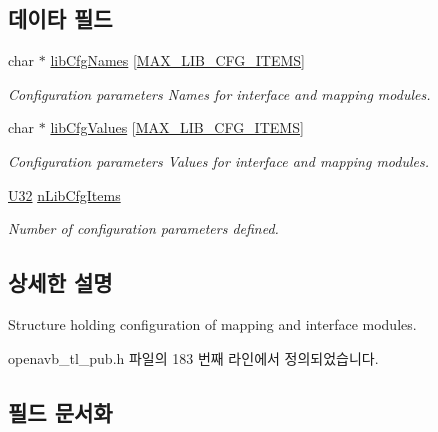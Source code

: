 \subsection*{데이타 필드}
\begin{DoxyCompactItemize}
\item 
char $\ast$ \hyperlink{structopenavb__tl__cfg__name__value__t_a6b520d18dfa6f6e0db32a7aaab48c507}{lib\+Cfg\+Names} \mbox{[}\hyperlink{tl_2openavb__tl__pub_8h_a43e337ad1ee671bfec5aadd8ea0a62f0}{M\+A\+X\+\_\+\+L\+I\+B\+\_\+\+C\+F\+G\+\_\+\+I\+T\+E\+MS}\mbox{]}
\begin{DoxyCompactList}\small\item\em Configuration parameters Names for interface and mapping modules. \end{DoxyCompactList}\item 
char $\ast$ \hyperlink{structopenavb__tl__cfg__name__value__t_a411ec7f07600718814c00ea5d84cecaf}{lib\+Cfg\+Values} \mbox{[}\hyperlink{tl_2openavb__tl__pub_8h_a43e337ad1ee671bfec5aadd8ea0a62f0}{M\+A\+X\+\_\+\+L\+I\+B\+\_\+\+C\+F\+G\+\_\+\+I\+T\+E\+MS}\mbox{]}
\begin{DoxyCompactList}\small\item\em Configuration parameters Values for interface and mapping modules. \end{DoxyCompactList}\item 
\hyperlink{openavb__types__base__pub_8h_a696390429f2f3b644bde8d0322a24124}{U32} \hyperlink{structopenavb__tl__cfg__name__value__t_ae7093f79d1305efd2444e40c505e74bc}{n\+Lib\+Cfg\+Items}
\begin{DoxyCompactList}\small\item\em Number of configuration parameters defined. \end{DoxyCompactList}\end{DoxyCompactItemize}


\subsection{상세한 설명}
Structure holding configuration of mapping and interface modules. 

openavb\+\_\+tl\+\_\+pub.\+h 파일의 183 번째 라인에서 정의되었습니다.



\subsection{필드 문서화}
